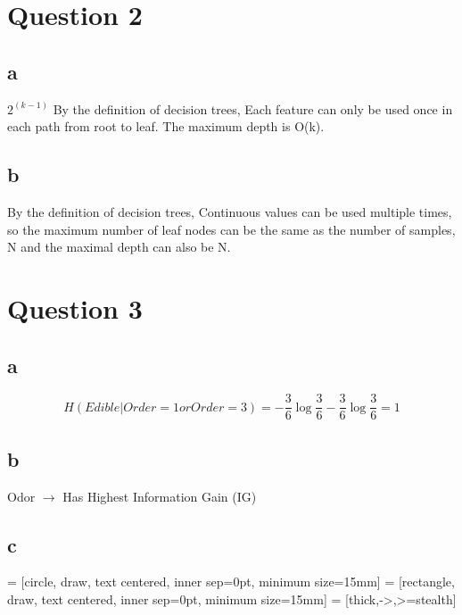 \documentclass{article}
\begin{document}
\pagebreak

\section{Question 2}

\subsection{a}
$2^{(k-1)}$ By the definition of decision trees, Each feature can only be used once in each path from root to leaf. The maximum depth is O(k).

\subsection{b}
By the definition of decision trees, Continuous values can be used multiple times, so the maximum number of leaf nodes can be the same as the number of samples, N and the maximal depth can also be N.

\pagebreak

\section{Question 3}

\subsection{a}

$$
H (Edible | Order=1 or Order=3) = -\frac{3}{6} \log\frac{3}{6} - \frac{3}{6} \log\frac{3}{6} = 1
$$

\bigskip

\subsection{b}

Odor $\rightarrow$ Has Highest Information Gain (IG)

\bigskip

\subsection{c}
 = [circle, draw, text centered, inner sep=0pt, minimum size=15mm]
 = [rectangle, draw, text centered, inner sep=0pt, minimum size=15mm]
 = [thick,->,>=stealth]
\end{document}
